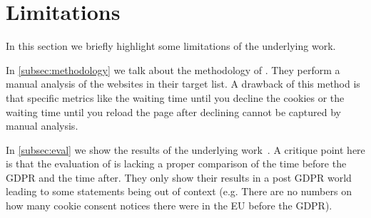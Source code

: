 \section{Limitations}
\label{sec:limitations}

In this section we briefly highlight some limitations of the underlying work.

In \autoref{subsec:methodology} we talk about the methodology of . They perform a manual analysis of
the websites in their target list. A drawback of this method is that specific metrics like the waiting time until you
decline the cookies or the waiting time until you reload the page after declining cannot be captured by manual analysis.

In \autoref{subsec:eval} we show the results of the underlying work~\cite{sanchez2019can}.
A critique point here is that the evaluation of  is lacking a proper comparison of the time before
the GDPR and the time after. They only show their results in a post GDPR world leading to some statements being out of
context (e.g. There are no numbers on how many cookie consent notices there were in the EU before the GDPR).

